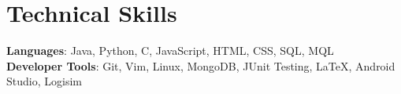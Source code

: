 \documentclass[letterpaper,11pt]{article}
\begin{document}
\section{Technical Skills}
 \begin{itemize}[leftmargin=0.15in, label={}]
    \small{\item{
     \textbf{Languages}{: Java, Python, C, JavaScript, HTML, CSS,  SQL, MQL} \\
     \textbf{Developer Tools}{: Git, Vim, Linux, MongoDB, JUnit Testing, LaTeX, Android Studio, Logisim} \\
    }}
 \end{itemize}


\end{document}
